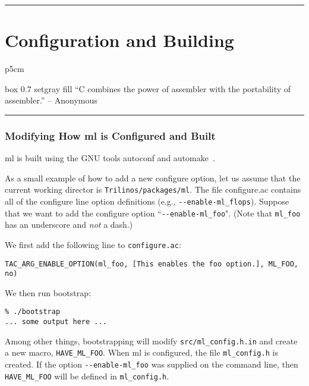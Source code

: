 \documentclass[10pt,letter,relax]{SANDreport}
\newcommand{\HRule}{\noindent\rule{\linewidth}{1mm}}
\newcommand{\ML}     {{\sc ml }}
\begin{document}

\clearpage
\newpage

\vspace*{3cm}
\HRule
\part{Configuration and Building}

\medskip

\hfill
\begin{tabular}{p{5cm}}
\begin{boxitpara}{box 0.7 setgray fill}
``C combines the power of assembler with the portability of assembler.''
                                 -- Anonymous
\end{boxitpara}
\end{tabular}

\HRule
\clearpage
\newpage


\section{Modifying How \ML is Configured and Built}
\label{sec:configure}

\ML is built using the GNU tools autoconf and automake~\cite{Autoconf,Automake}.

As a small example of how to add a new configure option, let us 
assume that the current working director is {\tt Trilinos/packages/ml}.
The file configure.ac contains all of the configure line option definitions
(e.g., \verb!--enable-ml_flops!).   Suppose that we want to add the configure option
``\verb!--enable-ml_foo!". (Note that \verb!ml_foo! has an underscore
and {\sl not} a dash.)

We first add the following line to \verb!configure.ac!:
\begin{verbatim}
TAC_ARG_ENABLE_OPTION(ml_foo, [This enables the foo option.], ML_FOO, no)
\end{verbatim}
We then run bootstrap:
\begin{verbatim}
% ./bootstrap
... some output here ...
\end{verbatim}
Among other things, bootstrapping  will modify
\verb!src/ml_config.h.in! and create a new macro, \verb!HAVE_ML_FOO!.
When \ML is configured, the file \verb!ml_config.h! is created.
If the option \verb!--enable-ml_foo! was supplied on the command line, then
\verb!HAVE_ML_FOO! will be defined in \verb!ml_config.h!.
\end{document}
